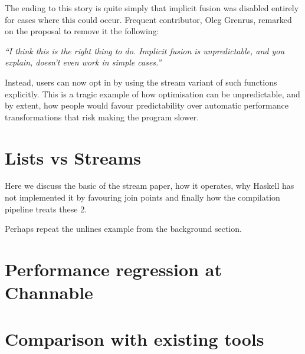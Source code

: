 The ending to this story is quite simply that implicit fusion was disabled entirely \cite{two_tails} for cases where this could occur.
Frequent  contributor, Oleg Grenrus, remarked on the proposal to remove it the following:

\textit{``I think this is the right thing to do. Implicit fusion is unpredictable, and you explain, doesn't even work in simple cases.''}

Instead, users can now opt in by using the stream variant of such functions explicitly. This is a tragic example of how optimisation
can be unpredictable, and by extent, how people would favour predictability over automatic performance transformations that risk making the program slower.

\section{Lists vs Streams}

Here we discuss the basic of the stream paper, how it operates, why Haskell has not implemented it by favouring join points and
finally how the compilation pipeline treats these 2.

Perhaps repeat the unlines example from the background section.


\section{Performance regression at Channable}

%

\section{Comparison with existing tools}
